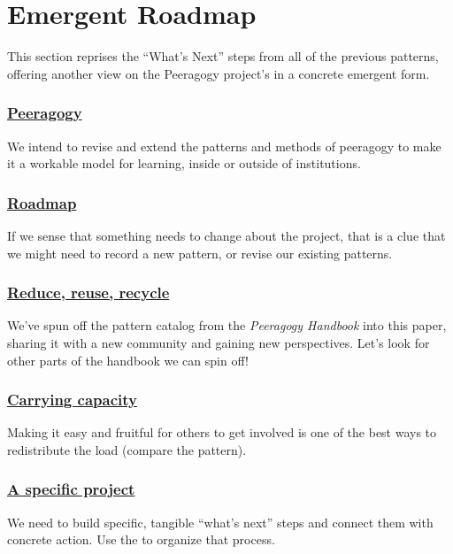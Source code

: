 \section{Emergent Roadmap} \label{sec:Distributed_Roadmap}

This section reprises the ``What's Next'' steps from all of the previous
patterns, offering another view on the Peeragogy project's
 in a concrete emergent form.

\subsubsection*{\hyperref[sec:Peeragogy]{Peeragogy}} 
 We intend to revise and extend the patterns and methods of peeragogy to make it a workable model for learning, inside or outside of institutions.

\subsubsection*{\hyperref[sec:Roadmap]{Roadmap}} 
If we sense that something needs to change about the project, that is a clue that we might need to record a new pattern, or revise our existing patterns.

\subsubsection*{\hyperref[sec:Reduce, reuse, recycle]{Reduce, reuse, recycle}}
We've spun off the pattern catalog from the \emph{Peeragogy Handbook} into this paper, sharing it with a new community and gaining new perspectives.  Let's look for other parts of the handbook we can spin off!

\subsubsection*{\hyperref[sec:Carrying capacity]{Carrying capacity}} 
Making it easy and fruitful for others to get involved is one of the best ways to
redistribute the load (compare the
pattern).

\subsubsection*{\hyperref[sec:A specific project]{A specific project}}
We need to build specific, tangible ``what's next'' steps and connect them with concrete action. Use the  to organize that process. 


